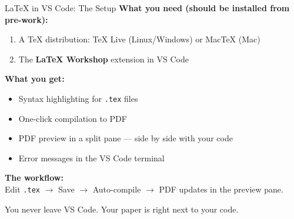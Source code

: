 \documentclass[aspectratio=169, 11pt]{beamer}
\begin{document}
\begin{frame}{\LaTeX{} in VS Code: The Setup}
  \textbf{What you need (should be installed from pre-work):}
  \begin{enumerate}
    \item A \TeX{} distribution: TeX Live (Linux/Windows) or MacTeX (Mac)
    \item The \textbf{LaTeX Workshop} extension in VS Code
  \end{enumerate}

  \vspace{0.8em}
  \textbf{What you get:}
  \begin{itemize}
    \item Syntax highlighting for \texttt{.tex} files
    \item One-click compilation to PDF
    \item PDF preview in a split pane --- side by side with your code
    \item Error messages in the VS Code terminal
  \end{itemize}

  \vspace{0.8em}
  \textbf{The workflow:}\\
  Edit \texttt{.tex} $\rightarrow$ Save $\rightarrow$ Auto-compile $\rightarrow$ PDF updates in the preview pane.

  \vspace{0.5em}
  You never leave VS Code. Your paper is right next to your code.

  \vspace{0.3em}
  \hfill \hyperlink{latexbasics}{}
\end{frame}
\end{document}
